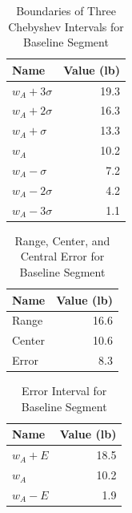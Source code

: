 %
\begin{table}[ht]
    \centering
    \begin{tabular}{l|r}
        \textbf{Name} & \textbf{Value} (lb) \\
        \hline
        $w_{A} + 3 \sigma$ & 19.3 \\
        $w_{A} + 2 \sigma$ & 16.3 \\
        $w_{A} + \sigma$ & 13.3 \\
        \hline
        $w_{A}$ & 10.2 \\
        \hline
        $w_{A} - \sigma$ & 7.2 \\
        $w_{A} - 2 \sigma$ & 4.2 \\
        $w_{A} - 3 \sigma$ & 1.1 \\
        \hline
    \end{tabular}
    \caption{Boundaries of Three Chebyshev Intervals for Baseline Segment}
    \label{table:00.baseline.chebyshev}
\end{table}
\newpage
%
\begin{table}[ht]
    \centering
    \begin{tabular}{l|r}
        \textbf{Name} & \textbf{Value} (lb) \\
		\hline
		Range & 16.6 \\
	    Center & 10.6 \\
		Error & 8.3 \\
		\hline
	\end{tabular}
    \caption{Range, Center, and Central Error for Baseline Segment}
    \label{table:00.baseline.range}
\end{table}
%
\begin{table}[ht]
    \centering
    \begin{tabular}{l|r} 
        \textbf{Name} & \textbf{Value} (lb) \\
		\hline
        $w_{A} + E$ & 18.5 \\
        $w_{A}$ & 10.2 \\
        $w_{A} - E$ & 1.9 \\
		\hline
	\end{tabular}
    \caption{Error Interval for Baseline Segment}
    \label{table:00.baseline.interval}
\end{table}
%
\newpage
